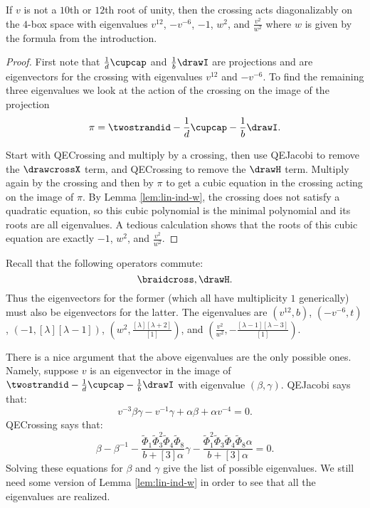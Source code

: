 \documentclass[12pt]{amsart}
\begin{document}
\begin{lemma}
If $v$ is not a $10$th or $12$th root of unity, then the crossing acts diagonalizably on the $4$-box space with eigenvalues $v^{12}$, $-v^{-6}$, $-1$, $w^2$, and $\frac{v^2}{w^2}$ where $w$ is given by the formula from the introduction.
\end{lemma}
\begin{proof}
First note that $\frac{1}{d} \cupcap$ and $\frac{1}{b} \drawI$ are projections and are eigenvectors for the crossing with eigenvalues $v^{12}$ and $-v^{-6}$.  To find the remaining three eigenvalues we look at the action of the crossing on the image of the projection
$$\pi = \twostrandid -\frac{1}{d} \cupcap -\frac{1}{b} \drawI.$$

Start with QECrossing and multiply by a crossing, then use QEJacobi to remove the $\drawcrossX$ term, and QECrossing to remove the $\drawH$ term.  Multiply again by the crossing and then by $\pi$ to get a cubic equation in the crossing acting on the image of $\pi$.  By Lemma \ref{lem:lin-ind-w}, the crossing does not satisfy a quadratic equation, so this cubic polynomial is the minimal polynomial and its roots are all eigenvalues.  A tedious calculation shows that the roots of this cubic equation are exactly $-1$, $w^2$, and $\frac{v^2}{w^2}$.  
\end{proof}

\begin{remark}
Recall that the following operators commute:
$$\braidcross, \drawH.$$
Thus the eigenvectors for the former (which all have multiplicity $1$ generically) must also be eigenvectors for the latter.  The eigenvalues are $(v^{12}, b)$, $(-v^{-6},t)$, $(-1, [\lambda][\lambda-1])$, $(w^2, \frac{[\lambda][\lambda+2]}{[1]})$, and $(\frac{v^2}{w^2}, -\frac{[\lambda-1][\lambda-3]}{[1]})$.

There is a nice argument that the above eigenvalues are the only possible ones.  Namely, suppose $v$ is an eigenvector in the image of $\twostrandid -\frac{1}{d} \cupcap -\frac{1}{b} \drawI$ with eigenvalue $(\beta, \gamma)$.  QEJacobi says that:
$$v^{-3} \beta \gamma -v^{-1} \gamma + \alpha \beta + \alpha v^{-4} = 0.$$
QECrossing says that:
$$\beta-\beta^{-1} - \frac{\widetilde{\Phi}_1 \widetilde{\Phi}_3^2 \widetilde{\Phi}_4 \widetilde{\Phi}_8}{b+[3]\alpha} \gamma - \frac{\widetilde{\Phi}_1^2 \widetilde{\Phi}_3 \widetilde{\Phi}_4 \widetilde{\Phi}_8 \alpha}{b+[3]\alpha} = 0.$$
Solving these equations for $\beta$ and $\gamma$ give the list of possible eigenvalues.  We still need some version of Lemma \ref{lem:lin-ind-w} in order to see that all the eigenvalues are realized.
\end{remark}
\end{document}
